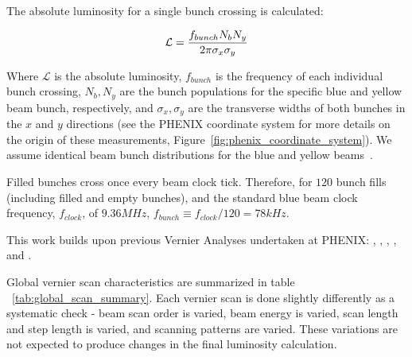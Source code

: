 {\noindent}The absolute luminosity for a single bunch crossing is calculated:

\begin{equation} 
\label{eq:lumi_one_bunch} 
\mathcal{L} = {f_{bunch}N_{b} N_{y}\over{2\pi\sigma_{x}\sigma_{y}}} 
\end{equation}

Where $\mathcal{L}$ is the absolute luminosity, $f_{bunch}$ is the frequency of
each individual bunch crossing, $N_{b}, N_{y}$ are the bunch populations for the
specific blue and yellow beam bunch, respectively, and $\sigma_{x}, \sigma_{y}$
are the transverse widths of both bunches in the $x$ and $y$ directions (see the
PHENIX coordinate system for more details on the origin of these measurements,
Figure~\ref{fig:phenix_coordinate_system}). We assume identical beam bunch
distributions for the blue and yellow beams~\cite{AN888Datta2010}.

Filled bunches cross once every beam clock tick. Therefore, for $120$ bunch
fills (including filled and empty bunches), and the standard blue beam clock
frequency, $f_{clock}$, of $9.36 MHz$, $f_{bunch} \equiv f_{clock} / 120 = 78
kHz$.

This work builds upon previous Vernier Analyses undertaken at PHENIX:
\cite{AN184Belikov2003}, \cite{an597Bazilevsky2007}, \cite{an688Bennett2008},
\cite{AN888Datta2010}, and \cite{Drees2009}.

Global vernier scan characteristics are summarized in table
~\ref{tab:global_scan_summary}. Each vernier scan is done slightly differently
as a systematic check - beam scan order is varied, beam energy is varied, scan
length and step length is varied, and scanning patterns are varied. These
variations are not expected to produce changes in the final luminosity
calculation.

